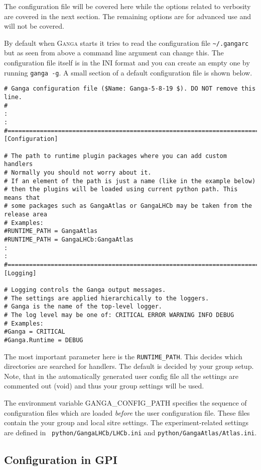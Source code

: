 \documentclass{howto}
\def\ganga {\textsc{Ganga}\xspace}
\begin{document}
The configuration file will be covered here while the options related to
verbosity are covered in the next section. The remaining options are for
advanced use and will not be covered.

By default when \ganga starts  it tries to read the configuration file
\texttt{\~{}/.gangarc} but  as seen from  above a command  line argument
can change  this. The configuration file  itself is in  the INI format
and you can create an empty  one by running \texttt{ganga -g}. A small
section of a default configuration file is shown below.

\begin{verbatim}
# Ganga configuration file ($Name: Ganga-5-8-19 $). DO NOT remove this line.
#
:
:
#=======================================================================
[Configuration]

# The path to runtime plugin packages where you can add custom handlers
# Normally you should not worry about it.
# If an element of the path is just a name (like in the example below)
# then the plugins will be loaded using current python path. This means that
# some packages such as GangaAtlas or GangaLHCb may be taken from the release area
# Examples:
#RUNTIME_PATH = GangaAtlas
#RUNTIME_PATH = GangaLHCb:GangaAtlas
:
:
#=======================================================================
[Logging]

# Logging controls the Ganga output messages.
# The settings are applied hierarchically to the loggers.
# Ganga is the name of the top-level logger.
# The log level may be one of: CRITICAL ERROR WARNING INFO DEBUG
# Examples:
#Ganga = CRITICAL
#Ganga.Runtime = DEBUG
\end{verbatim}

The most  important parameter here is  the \texttt{RUNTIME_PATH}. This
decides which  directories are searched  for handlers. The  default is
decided by your group setup. Note, that in the automatically generated
user config  file all the settings  are commented out  (void) and thus
your group settings will be used. 

The environment  variable GANGA_CONFIG_PATH specifies  the sequence of
configuration   files  which   are  loaded   {\it  before}   the  user
configuration  file.  These  files contain  the your  group  and local
sitre settings.   The experiment-related settings are  defined in {\tt
python/GangaLHCb/LHCb.ini} and {\tt python/GangaAtlas/Atlas.ini}.

\subsection{Configuration in GPI}
\end{document}
